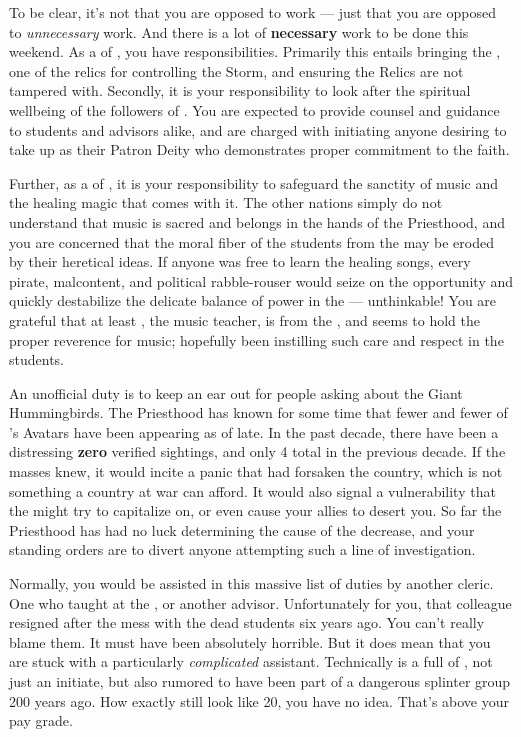 \documentclass[char]{GL2020}
\begin{document}
To be clear, it's not that you are opposed to work — just that you are opposed to \emph{unnecessary} work. And there is a lot of \textbf{necessary} work to be done this weekend. As a \cHedonist{\cleric} of \cFarmGod{}, you have responsibilities. Primarily this entails bringing the \iPitcher{}, one of the \pFarm{} relics for controlling the Storm, and ensuring the Relics are not tampered with. Secondly, it is your responsibility to look after the spiritual wellbeing of the followers of \cFarmGod{}. You are expected to provide counsel and guidance to students and advisors alike, and are charged with initiating anyone desiring to take up \cFarmGod{} as their Patron Deity who demonstrates proper commitment to the faith. 

Further, as a \cHedonist{\cleric} of \cFarmGod{}, it is your responsibility to safeguard the sanctity of music and the healing magic that comes with it. The other nations simply do not understand that music is sacred and belongs in the hands of the Priesthood, and you are concerned that the moral fiber of the students from the \pFarm{} may be eroded by their heretical ideas. If anyone was free to learn the healing songs, every pirate, malcontent, and political rabble-rouser would seize on the opportunity and quickly destabilize the delicate balance of power in the \pFarm{} — unthinkable! You are grateful that at least \cMusic{\intro}, the music teacher, is from the \pFarm{}, and seems to hold the proper reverence for music; hopefully \cMusic{\theyhave} been instilling such care and respect in the students.

An unofficial duty is to keep an ear out for people asking about the Giant Hummingbirds. The Priesthood has known for some time that fewer and fewer of \cFarmGod{}'s Avatars have been appearing as of late. In the past decade, there have been a distressing \textbf{zero} verified sightings, and only 4 total in the previous decade. If the masses knew, it would incite a panic that \cFarmGod{} had forsaken the country, which is not something a country at war can afford. It would also signal a vulnerability that the \pShippies{} might try to capitalize on, or even cause your \pTech{} allies to desert you. So far the Priesthood has had no luck determining the cause of the decrease, and your standing orders are to divert anyone attempting such a line of investigation.

Normally, you would be assisted in this massive list of duties by another cleric. One who taught at the \pSchool{}, or another advisor. Unfortunately for you, that colleague resigned after the mess with the dead students six years ago. You can’t really blame them. It must have been absolutely horrible. But it does mean that you are stuck with a particularly \emph{complicated} assistant. Technically \cDisney{\intro} is a full \cDisney{\cleric} of \cFarmGod{}, not just an initiate, but \cDisney{\theyare} also rumored to have been part of a dangerous splinter group 200 years ago. How exactly \cDisney{\they} still look\cDisney{\verbs} like \cDisney{\theyare} 20, you have no idea. That’s above your pay grade.
\end{document}
